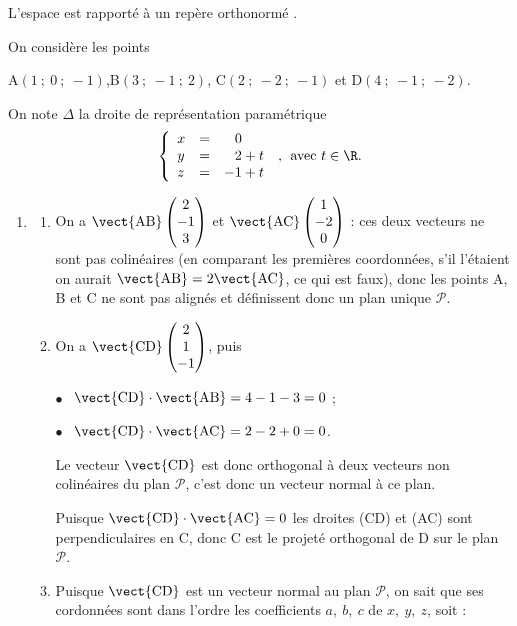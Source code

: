 \medskip

L'espace est rapporté à un repère orthonormé \Oijk.

On considère les points 
\begin{center}A$(1~;~0~;~-1)$,\quad  B$(3~;~-1~;~2)$, \quad C$(2~;~-2~;~ -1)$ \quad et \quad D$(4~;~-1~;~-2)$.\end{center}

On note $\Delta$ la droite de représentation paramétrique 
\[\left\{\begin{array}{l c l}
x &=&\phantom{-}0\\
y &=&\phantom{-}2 + t\\
z &=& -1 + t
\end{array}\right.\:,\:\: \text{avec } t\in \R.\]

\begin{enumerate}
\item 
	\begin{enumerate}
		\item 

On a $\vect{\text{AB}}\begin{pmatrix}2\\-1\\3\end{pmatrix}$ et $\vect{\text{AC}}\begin{pmatrix}1\\-2\\0\end{pmatrix}$ : ces deux vecteurs ne sont pas colinéaires (en comparant les premières coordonnées, s'il l'étaient on aurait $\vect{\text{AB}} = 2\vect{\text{AC}}$, ce qui est faux), donc les points A, B et C ne sont pas alignés et définissent donc un plan unique $\mathcal{P}$.
		\item 
On a $\vect{\text{CD}}\begin{pmatrix}2\\1\\-1 \end{pmatrix}$, puis 

$\bullet~~$ $\vect{\text{CD}} \cdot \vect{\text{AB}} = 4 - 1 - 3 = 0$ ;

$\bullet~~$ $\vect{\text{CD}} \cdot \vect{\text{AC}} = 2 - 2 + 0 = 0$.

Le vecteur $\vect{\text{CD}}$ est donc orthogonal à deux vecteurs non colinéaires du plan $\mathcal{P}$, c'est donc un vecteur normal à ce plan.


Puisque $\vect{\text{CD}} \cdot \vect{\text{AC}}  = 0$ les droites (CD) et (AC) sont perpendiculaires en C, donc C est le projeté orthogonal de D sur le plan $\mathcal{P}$.
		\item 
		Puisque $\vect{\text{CD}}$ est un vecteur normal au plan $\mathcal{P}$, on sait que ses cordonnées sont dans l'ordre les coefficients $a, \: b,\:c$ de $x,\:y,\:z$, soit :
		

\end{enumerate}
\end{enumerate}

